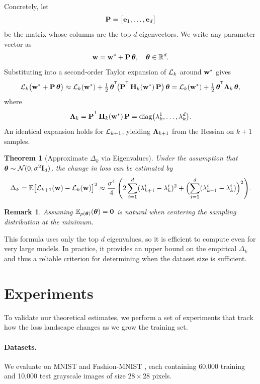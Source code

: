 \documentclass{article}
\newtheorem{theorem}{Theorem} %
\newtheorem{remark}{Remark}
\begin{document}
Concretely, let
$$
  \mathbf{P} =
  \bigl[ \mathbf{e}_1, \dots, \mathbf{e}_d \bigr]
$$
be the matrix whose columns are the top $d$ eigenvectors.  We write any parameter vector as
$$
  \mathbf{w} =
  \mathbf{w}^* + \mathbf{P}\, \boldsymbol{\theta}, \quad
  \boldsymbol{\theta} \in \mathbb R^d.
$$
Substituting into a second‑order Taylor expansion of $\mathcal{L}_k$ around $\mathbf{w}^*$ gives
$$
  \cL_k\bigl(\bw^* + \bP\,\btheta\bigr) \approx
  \cL_k(\bw^*) + \tfrac12\, \btheta^{\T}\! \bigl( \bP^{\T}\, \bH_k(\bw^*)\, \bP\bigr)\, \btheta =
  \cL_k(\bw^*) + \tfrac12\, \btheta^{\T} \bLambda_k\, \btheta,
$$
where
$$
  \bLambda_k =
  \bP^{\T}\, \bH_k(\bw^*)\, \bP =
  \operatorname{diag} \bigl( \lambda_k^1, \dots, \lambda_k^d \bigr).
$$
An identical expansion holds for $\mathcal{L}_{k+1}$, yielding $\boldsymbol{\Lambda}_{k+1}$ from the Hessian on $k+1$ samples.

\begin{theorem}[Approximate $\Delta_k$ via Eigenvalues]
  Under the assumption that $\boldsymbol{\theta} \sim \mathcal N(0, \sigma^2 \mathbf I_d)$, the change in loss can be estimated by
  $$
    \Delta_k =
    \mathbb E \bigl[ \mathcal{L}_{k+1}(\mathbf{w}) - \mathcal{L}_k(\mathbf{w}) \bigr]^2 \approx
    \frac{\sigma^4}{4}\, \Biggl( 2 \sum_{i=1}^d (\lambda_{k+1}^i - \lambda_k^i)^2
    + \Bigl( \sum_{i=1}^d (\lambda_{k+1}^i - \lambda_k^i) \Bigr)^2 \Biggr).
  $$
\end{theorem}

\begin{remark}
  Assuming $\mathbb{E}_{p(\boldsymbol{\theta})}(\boldsymbol{\theta}) = \mathbf{0}$ is natural when centering the sampling distribution at the minimum.
\end{remark}

This formula uses only the top $d$ eigenvalues, so it is efficient to compute even for very large models.
In practice, it provides an upper bound on the empirical $\Delta_k$ and thus a reliable criterion for determining when the
dataset size is sufficient.


\section{Experiments}

To validate our theoretical estimates, we perform a set of experiments that track how the loss landscape changes as we grow the
training set.

\paragraph{Datasets.}
We evaluate on MNIST \cite{deng2012mnist} and Fashion‑MNIST \cite{xiao2017fashion}, each containing 60,000 training and 10,000 test
grayscale images of size $28\times28$ pixels.
\end{document}
